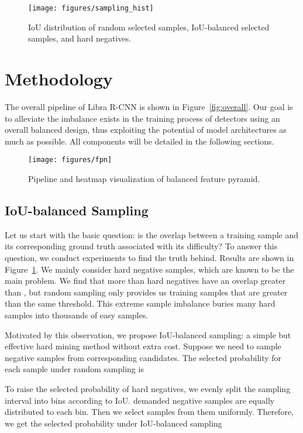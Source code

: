 \documentclass[10pt,twocolumn,letterpaper]{article}
\begin{document}
\begin{figure}
	\centering
	\texttt{[image: figures/sampling\_hist]}
	\caption{IoU distribution of random selected samples, IoU-balanced selected samples, and hard negatives.}
	\label{fig:sample_dist}
\end{figure}
 \section{Methodology}

The overall pipeline of Libra R-CNN is shown in Figure~\ref{fig:overall}.
Our goal is to alleviate the imbalance exists in the training process of detectors using an overall balanced design,
thus exploiting the potential of model architectures as much as possible.
All components will be detailed in the following sections.

\begin{figure*}
	\centering
	\texttt{[image: figures/fpn]}
	\caption{Pipeline and heatmap visualization of balanced feature pyramid.}
	\label{fig:fpn}
\end{figure*}

\subsection{IoU-balanced Sampling}
\label{subsec:sample}
Let us start with the basic question:
is the overlap between a training sample and its corresponding ground truth associated with its difficulty?
To answer this question, we conduct experiments to find the truth behind.
Results are shown in Figure~\ref{fig:sample_dist}.
We mainly consider hard negative samples, which are known to be the main problem.
We find that more than  hard negatives have an overlap greater than ,
but random sampling only provides us  training samples that are greater than the same threshold.
This extreme sample imbalance buries many hard samples into thousands of easy samples.

Motivated by this observation, we propose IoU-balanced sampling: a simple but effective hard mining method without extra cost.
Suppose we need to sample  negative samples from  corresponding candidates.
The selected probability for each sample under random sampling is


To raise the selected probability of hard negatives,
we evenly split the sampling interval into  bins according to IoU.
 demanded negative samples are equally distributed to each bin.
Then we select samples from them uniformly.
Therefore, we get the selected probability under IoU-balanced sampling
\end{document}
